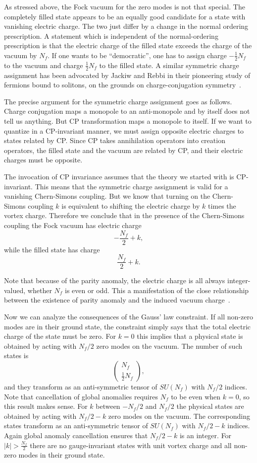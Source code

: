\documentclass[a4paper,12pt, amsfonts, amssymb]{article}
\begin{document}
As stressed above, the Fock vacuum for the zero
modes is not that special. The completely filled state appears to be
an equally good candidate for a state with vanishing electric charge. The
two just differ by a change in the normal ordering prescription.
A statement which is independent of the normal-ordering prescription
is that the electric charge of the filled state exceeds the charge of the
vacuum by $N_f$. If one wants to be ``democratic'', one has 
to assign charge $-\frac{1}{2}N_f$ to the vacuum and charge $\frac{1}{2}N_f$
to the filled state. A similar symmetric charge assignment has been
advocated by Jackiw and Rebbi in their pioneering study of fermions bound 
to solitons, on the grounds on charge-conjugation symmetry~\cite{JR}.

The precise argument for the symmetric charge assignment goes as follows.
Charge conjugation maps a monopole to an anti-monopole and by itself does
not tell us anything. But CP transformation maps a monopole to itself.
If we want to quantize in a CP-invariant
manner, we must assign opposite electric charges to states related by CP.
Since CP takes annihilation operators into creation operators,
the filled state and the vacuum are related by CP, and their electric
charges must be opposite.

The invocation of CP invariance assumes that the theory
we started with is CP-invariant. This means that the symmetric
charge assignment is valid for a vanishing Chern-Simons coupling. But we
know that turning on the Chern-Simons coupling $k$ is equivalent
to shifting the electric charge by $k$ times the
vortex charge. Therefore we conclude that in the
presence of the Chern-Simons coupling the Fock vacuum has electric charge
$$
-\frac{N_f}{2}+k,
$$
while the filled state has charge
$$
\frac{N_f}{2}+k.
$$

Note that because of the parity anomaly, the electric charge is all always integer-valued, whether $N_f$ is even or odd. This a manifestation of
the close relationship between the existence of parity anomaly
and the induced vacuum charge~\cite{NS}.

Now we can analyze the consequences of the Gauss' law constraint.
If all non-zero modes are in their ground state, the constraint
simply says that the total electric charge of the state must be
zero. 
For $k=0$ this implies that a physical state is obtained
by acting with $N_f/2$ zero modes on the vacuum. The number of
such states is
$$
\left(\begin{array}{r} N_f \\ \frac{1}{2} N_f \end{array}\right),
$$
and they transform as an anti-symmetric tensor of $SU(N_f)$
with $N_f/2$ indices. Note that cancellation of global anomalies
requires $N_f$ to be even when $k=0$, so this result makes sense.
For $k$ between
$-N_f/2$ and $N_f/2$ the physical states are obtained by acting
with $N_f/2-k$ zero modes on the vacuum. The corresponding states
transform as an anti-symmetric tensor of $SU(N_f)$ with
$N_f/2-k$ indices. Again global anomaly cancellation ensures
that $N_f/2-k$ is an integer. For $|k|>\frac{N_f}{2}$ there 
are no gauge-invariant states with unit vortex charge and all
non-zero modes in their ground state.
 
\end{document}
